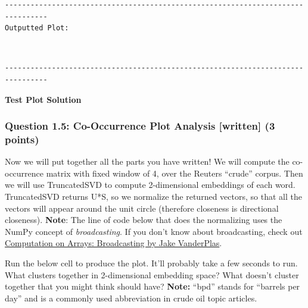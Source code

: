 \documentclass[18pt]{article}
\begin{document}
    \begin{Verbatim}[commandchars=\\\{\}]
--------------------------------------------------------------------------------
Outputted Plot:

    \end{Verbatim}

    \begin{center}
    \end{center}
    { \hspace*{\fill} \\}
    
    \begin{Verbatim}[commandchars=\\\{\}]
--------------------------------------------------------------------------------

    \end{Verbatim}

    \textbf{Test Plot Solution} 

    \hypertarget{question-1.5-co-occurrence-plot-analysis-written-3-points}{%
\subsubsection{Question 1.5: Co-Occurrence Plot Analysis {[}written{]}
(3
points)}\label{question-1.5-co-occurrence-plot-analysis-written-3-points}}

Now we will put together all the parts you have written! We will compute
the co-occurrence matrix with fixed window of 4, over the Reuters
``crude'' corpus. Then we will use TruncatedSVD to compute 2-dimensional
embeddings of each word. TruncatedSVD returns U*S, so we normalize the
returned vectors, so that all the vectors will appear around the unit
circle (therefore closeness is directional closeness). \textbf{Note}:
The line of code below that does the normalizing uses the NumPy concept
of \emph{broadcasting}. If you don't know about broadcasting, check out
\href{https://jakevdp.github.io/PythonDataScienceHandbook/02.05-computation-on-arrays-broadcasting.html}{Computation
on Arrays: Broadcasting by Jake VanderPlas}.

Run the below cell to produce the plot. It'll probably take a few
seconds to run. What clusters together in 2-dimensional embedding space?
What doesn't cluster together that you might think should have?
\textbf{Note:} ``bpd'' stands for ``barrels per day'' and is a commonly
used abbreviation in crude oil topic articles.
\end{document}
